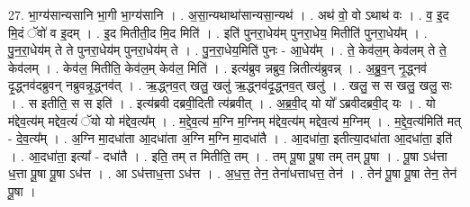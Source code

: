 \documentclass[17pt]{extarticle}
\begin{document}
27. भा॒ग्य॑सान्यसानि भा॒गी भा॒ग्य॑सानि । . अ॒सा॒न्यथाथा॑सान्यसा॒न्यथ॑ । . अथ॑ वो॒ वो ऽथाथ॑ वः । . व॒ इ॒द मि॒दं ॅवो॑ व इ॒दम् । . इ॒द मितीती॒द मि॒द मिति॑ । . इति॑ पुनरा॒धेय॑म् पुनरा॒धेय॒ मितीति॑ पुनरा॒धेय᳚म् । . पु॒न॒रा॒धेय॑म् ते ते पुनरा॒धेय॑म् पुनरा॒धेय॑म् ते । . पु॒न॒रा॒धेय॒मिति॑ पुनः - आ॒धेय᳚म् । . ते॒ केव॑ल॒म् केव॑लम् ते ते॒ केव॑लम् । . केव॑ल॒ मितीति॒ केव॑ल॒म् केव॑ल॒ मिति॑ । . इत्य॑ब्रुव न्नब्रुव॒ न्नितीत्य॑ब्रुवन्न् । . अ॒ब्रु॒व॒न् नृ॒द्ध्नव॑ दृ॒द्ध्नव॑दब्रुवन् नब्रुवन्नृ॒द्ध्नव॑त् । . ऋ॒द्ध्नव॒त् खलु॒ खलु॑ ऋ॒द्ध्नव॑दृ॒द्ध्नव॒त् खलु॑ । . खलु॒ स स खलु॒ खलु॒ सः । . स इतीति॒ स स इति॑ । . इत्य॑ब्रवी दब्रवी॒दिती त्य॑ब्रवीत् । . अ॒ब्र॒वी॒द् यो यो᳚ ऽब्रवीदब्रवी॒द् यः । . यो म॑द्देव॒त्य॑म् मद्देव॒त्यं॑ ॅयो यो म॑द्देव॒त्य᳚म् । . म॒द्दे॒व॒त्य॑ म॒ग्नि म॒ग्निम् म॑द्देव॒त्य॑म् मद्देव॒त्य॑ म॒ग्निम् । . म॒द्दे॒व॒त्य॑मिति॑ मत् - दे॒व॒त्य᳚म् । . अ॒ग्नि मा॒दधा॑ता आ॒दधा॑ता अ॒ग्नि म॒ग्नि मा॒दधा॑तै । . आ॒दधा॑ता॒ इतीत्या॒दधा॑ता आ॒दधा॑ता॒ इति॑ । . आ॒दधा॑ता॒ इत्या᳚ - दधा॑तै । . इति॒ तम् त मितीति॒ तम् । . तम् पू॒षा पू॒षा तम् तम् पू॒षा । . पू॒षा ऽध॑त्ता ध॒त्ता पू॒षा पू॒षा ऽध॑त्त । . आ ऽध॑त्ताध॒त्ता ऽध॑त्त । . अ॒ध॒त्त॒ तेन॒ तेना॑धत्ताधत्त॒ तेन॑ । . तेन॑ पू॒षा पू॒षा तेन॒ तेन॑ पू॒षा । \newline
\end{document}
